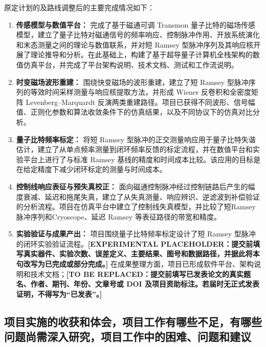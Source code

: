 \documentclass[a4paper,12pt]{article}
\begin{document}
\par 原定计划的及路线调整后的主要完成情况如下：
\begin{enumerate}
    \item \textbf{传感模型与数值平台：} 完成了基于磁通可调 Transmon 量子比特的磁场传感模型，建立了量子比特对磁通信号的频率响应、控制脉冲作用、开放系统演化和末态测量之间的理论与数值联系，并对短 Ramsey 型脉冲序列及其响应核开展了理论推导和分析。在此基础上，构建了基于超导量子计算机全栈架构的数值仿真平台，并完成了平台架构说明、技术文档、测试和工作流说明。

    \item \textbf{时变磁场波形重建：} 围绕快变磁场的波形重建，建立了短 Ramsey 型脉冲序列的等效时间采样测量与响应核提取方法，并形成 Wiener 反卷积和全密度矩阵 Levenberg--Marquardt 反演两类重建路径。项目已获得不同波形、信号幅值、正则化参数和算法收敛条件下的仿真结果，以及不同协议下的仿真对比分析。

    \item \textbf{量子比特频率标定：} 将短 Ramsey 型脉冲的正交测量响应用于量子比特失谐估计，建立了从单点频率测量到闭环频率反馈的标定流程，并在数值平台和实验平台上进行了与标准 Ramsey 基线的精度和时间成本比较。该应用的目标是在给定精度下减少闭环标定的测量与时间成本。

    \item \textbf{控制线响应表征与预失真校正：} 面向磁通控制脉冲经过控制链路后产生的幅度衰减、延迟和拖尾失真，建立了从失真测量、响应辨识、逆滤波到补偿验证的分析流程。项目在仿真平台中建立了控制线失真模型，并比较了短Ramsey脉冲序列和Cryoscope、延迟 Ramsey 等表征路径的带宽和精度。

    \item \textbf{实验验证与成果产出：} 项目围绕量子比特频率标定设计了短 Ramsey 型脉冲的闭环实验验证流程。\textbf{[EXPERIMENTAL PLACEHOLDER：提交前填写真实器件、实验次数、误差定义、主要结果、图号和数据路径，并据此将本句改写为已完成或部分完成。]} 在成果整理方面，项目已形成软件平台、架构说明和技术文档；\textbf{[TO BE REPLACED：提交前填写已发表论文的真实题名、作者、期刊、年份、文章号或 DOI 及项目资助标注。若届时无正式发表证明，不得写为“已发表”。]}
\end{enumerate}


\vspace{2cm}

\subsection{项目实施的收获和体会，项目工作有哪些不足，有哪些问题尚需深入研究，项目工作中的困难、问题和建议}
\vspace{2cm}
\end{document}
